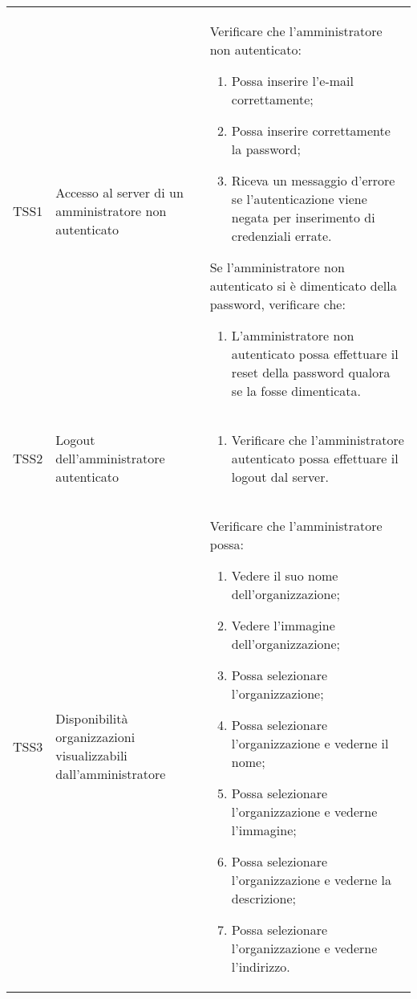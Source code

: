 {\begin{longtable}{ c  C{3cm}  C{11cm} }
TSS1 & Accesso al server di un amministratore non autenticato & 
Verificare che l'amministratore non autenticato:
\begin{enumerate}
    \item Possa inserire l'e-mail correttamente;
    \item Possa inserire correttamente la password;
    \item Riceva un messaggio d'errore se l'autenticazione viene negata per inserimento di credenziali errate.
\end{enumerate}
Se l'amministratore non autenticato si è dimenticato della password, verificare che:
\begin{enumerate}
    \item L'amministratore non autenticato possa effettuare il reset della password qualora se la fosse dimenticata.
\end{enumerate} \\

TSS2 & Logout dell'amministratore autenticato & \begin{enumerate}
    \item Verificare che l'amministratore autenticato possa effettuare il logout dal server.
\end{enumerate} \\

TSS3 & Disponibilità organizzazioni visualizzabili dall'amministratore &
Verificare che l'amministratore possa:
\begin{enumerate}
    \item Vedere il suo nome dell'organizzazione;
    \item Vedere l'immagine dell'organizzazione;
    \item Possa selezionare l'organizzazione;
    \item Possa selezionare l'organizzazione e vederne il nome;
    \item Possa selezionare l'organizzazione e vederne l'immagine;
    \item Possa selezionare l'organizzazione e vederne la descrizione;
    \item Possa selezionare l'organizzazione e vederne l'indirizzo.
\end{enumerate} \\


\end{longtable}}
